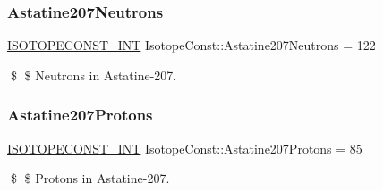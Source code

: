 \subsubsection{\texorpdfstring{Astatine207\+Neutrons}{Astatine207Neutrons}}
{\footnotesize\ttfamily \mbox{\hyperlink{group___isotope_const-_macros_ga5f18360b3e99483a35c32d789e62621c}{I\+S\+O\+T\+O\+P\+E\+C\+O\+N\+S\+T\+\_\+\+I\+NT}} Isotope\+Const\+::\+Astatine207\+Neutrons = 122}

\$ \$ Neutrons in Astatine-\/207. \mbox{\label{group___isotope_const-_astatine-_at207_ga91d602ffcc0a9a44091b1cd50e0a00e5}} 
\subsubsection{\texorpdfstring{Astatine207\+Protons}{Astatine207Protons}}
{\footnotesize\ttfamily \mbox{\hyperlink{group___isotope_const-_macros_ga5f18360b3e99483a35c32d789e62621c}{I\+S\+O\+T\+O\+P\+E\+C\+O\+N\+S\+T\+\_\+\+I\+NT}} Isotope\+Const\+::\+Astatine207\+Protons = 85}

\$ \$ Protons in Astatine-\/207. 